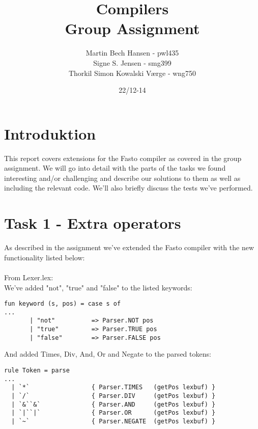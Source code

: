 \documentclass{article}
\begin{document}

\title{Compilers\\Group Assignment}
\author{Martin Bech Hansen - pwl435\\Signe S. Jensen - smg399\\Thorkil Simon Kowalski Værge - wng750}

\date{22/12-14}

\maketitle
\newpage

\tableofcontents

\newpage

\section{Introduktion}
This report covers extensions for the Fasto compiler as covered in the group assignment. We will go into detail with the parts of the tasks we found interesting and/or challenging and describe our solutions to them as well as including the relevant code. We'll also briefly discuss the tests we've performed.

\section{Task 1 - Extra operators}

As described in the assignment we've extended the Fasto compiler with the new functionality listed below:\\
\\
From Lexer.lex:\\
We've added "not", "true" and "false" to the listed keywords:
\begin{lstlisting}
fun keyword (s, pos) = case s of
...
       | "not"          => Parser.NOT pos
       | "true"         => Parser.TRUE pos
       | "false"        => Parser.FALSE pos       
\end{lstlisting}
\noindent And added Times, Div, And, Or and Negate to the parsed tokens:
\begin{lstlisting}
rule Token = parse
...
  | `*`                 { Parser.TIMES   (getPos lexbuf) }
  | `/`                 { Parser.DIV     (getPos lexbuf) }
  | `&``&`              { Parser.AND     (getPos lexbuf) }
  | `|``|`              { Parser.OR      (getPos lexbuf) }
  | `~`                 { Parser.NEGATE  (getPos lexbuf) }
\end{lstlisting}
\end{document}

